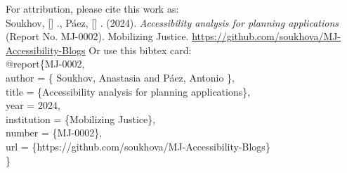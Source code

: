 \documentclass[12pt, oneside]{report}
\newcommand*{\ExtractFirstChar}[1]{%
        \StrChar{#1}{1}[\FirstChar]%
    \FirstChar
}
\begin{document}
  \vskip 20pt
  For attribution, please cite this work as:\\
  \vskip 1pt
            {Soukhov, \ExtractFirstChar{Anastasia}.,}
              {Páez, \ExtractFirstChar{Antonio}.}
   (2024). \textit{Accessibility analysis for planning
applications} (Report No. MJ-0002). Mobilizing Justice. \url{https://github.com/soukhova/MJ-Accessibility-Blogs}
  \vskip 20pt
  Or use this bibtex card:\\
  \vskip 1pt
  @report\{MJ-0002,\\
           \hspace*{1.6cm} author = \{                                                                                  {Soukhov, Anastasia and} 
                                                                                                                          {Páez, Antonio}
                                                                                \},\\
           \hspace*{1.6cm} title = \{Accessibility analysis for planning
applications\},\\
           \hspace*{1.6cm} year = {2024},\\
           \hspace*{1.6cm} institution = \{Mobilizing Justice\},\\
           \hspace*{1.6cm} number = \{MJ-0002\},\\
           \hspace*{1.6cm} url = \{https://github.com/soukhova/MJ-Accessibility-Blogs\}\\
  \}

\vspace*{\fill}
{}
\end{document}
